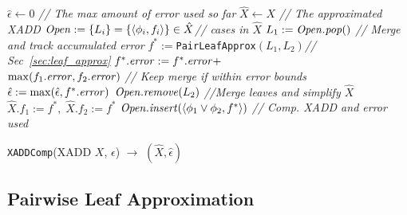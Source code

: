 \incmargin{1.5em}
\linesnumbered
\begin{algorithm}[t!]
\dontprintsemicolon
$\hat{\epsilon} \gets 0$ \emph{// The max amount of error used so far}\;
$\hat{X} \gets X$ \emph{// The approximated XADD}\;
$\mathit{Open} := \{ L_i \} = \{ \langle \phi_i, f_i \rangle \} \in \hat{X}$\emph{// cases in $\hat{X}$}\;
\While{$\Open \neq \emptyset$} {
	$L_1 := \mathit{Open}.\mathit{pop}()$\;
	  { 
                \emph{// Merge and track accumulated error}\;
		$f^* := $\texttt{PairLeafApprox}$(L_1, L_2)$\emph{// Sec~\ref{sec:leaf_approx}}\;
	        $f^*.\mathit{error} := f^*.\mathit{error} + $\\\hspace{18mm}$\max(f_1.\mathit{error},f_2.\mathit{error})$\;
                \emph{// Keep merge if within error bounds}\;
		{       
                        $\hat{\epsilon} := \max(\hat{\epsilon}, f^*.\mathit{error})$\;
			$\mathit{Open}.\mathit{remove}(L_2)$\;
                        \emph{//Merge leaves and simplify $\hat{X}$}
			$\hat{X}.f_1 := f^*, \; \hat{X}.f_2 := f^*$\; 
			\; 
			$\mathit{Open}.\mathit{insert}(\langle \phi_1 \lor \phi_2, f^* \rangle)$\;
		}
	}
}
\emph{// Comp. XADD and error used}\;
\caption{\footnotesize 
 \texttt{XADDComp}(XADD $X$, $\epsilon$) $\longrightarrow$ $(\hat{X},\hat{\epsilon})$}
\label{alg:approx}
\end{algorithm}
\decmargin{1.5em}

\subsection{Pairwise Leaf Approximation}

